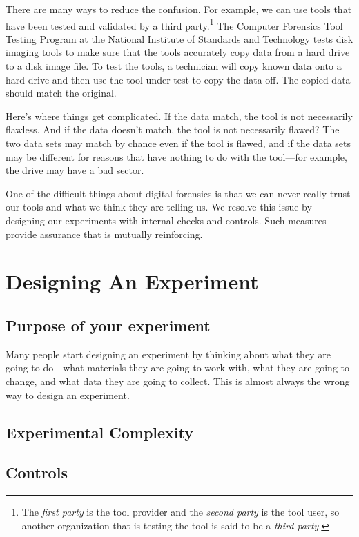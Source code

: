 There are many ways to reduce the confusion. For example, we can use
tools that have been
tested and validated by a third party.\footnote{The \emph{first party}
  is the tool provider and the \emph{second party} is the tool user,
  so another organization that is testing the tool is said to be a
  \emph{third party}.} The Computer Forensics Tool
Testing Program at the National Institute of
Standards and Technology tests disk imaging tools to make sure that
the tools accurately copy data from a hard drive to a disk image
file. To test the tools, a technician will copy known data onto a hard
drive and then use the tool under test to copy the data off. The copied data
should match the original.

Here's where things get complicated. If the data match, the tool is
not necessarily flawless. And if the data doesn't match, the tool
is not necessarily flawed? The two data sets may match by chance even
if the tool is flawed, and if the data sets may be different for
reasons that have nothing to do with the tool---for example, the drive
may have a bad sector. 

One of the difficult things about digital forensics is that we
can never really trust our tools and what we think they are telling
us. We resolve this issue by designing our experiments with internal
checks and controls. Such measures provide assurance that is mutually reinforcing.

\section{Designing An Experiment}


\subsection{Purpose of your experiment}

Many people start designing an experiment by thinking about what they
are going to do---what materials they are going to work with, what they are going to
change, and what data they are going to collect. This is almost always
the wrong way to design an experiment.

\subsection{Experimental Complexity}

\subsection{Controls}

